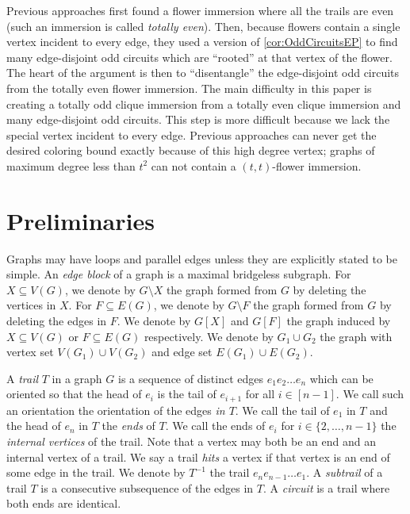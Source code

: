\documentclass{article}
\theoremstyle{definition}
\begin{document}
Previous approaches first found a flower immersion where all the trails are even (such an immersion is called \emph{totally even}). Then, because flowers contain a single vertex incident to every edge, they used a version of \cref{cor:OddCircuitsEP} to find many edge-disjoint odd circuits which are ``rooted'' at that vertex of the flower. The heart of the argument is then to ``disentangle'' the edge-disjoint odd circuits from the totally even flower immersion. The main difficulty in this paper is creating a totally odd clique immersion from a totally even clique immersion and many edge-disjoint odd circuits. This step is more difficult because we lack the special vertex incident to every edge. Previous approaches can never get the desired coloring bound exactly because of this high degree vertex; graphs of maximum degree less than $t^2$ can not contain a $(t,t)$-flower immersion.

\section{Preliminaries}\label{section:Preliminaries}

Graphs may have loops and parallel edges unless they are explicitly stated to be simple. An \emph{edge block} of a graph is a maximal bridgeless subgraph. For $X \subseteq V(G)$, we denote by $G \setminus X$ the graph formed from $G$ by deleting the vertices in $X$. For $F \subseteq E(G)$, we denote by $G \setminus F$ the graph formed from $G$ by deleting the edges in $F$. We denote by $G[X]$ and $G[F]$ the graph induced by $X \subseteq V(G)$ or $F \subseteq E(G)$ respectively. We denote by $G_1 \cup G_2$ the graph with vertex set $V(G_1) \cup V(G_2)$ and edge set $E(G_1) \cup E(G_2)$.

A \emph{trail} $T$ in a graph $G$ is a sequence of distinct edges $e_1e_2\dots e_n$ which can be oriented so that the head of $e_i$ is the tail of $e_{i+1}$ for all $i \in [n-1]$. We call such an orientation the orientation of the edges \emph{in $T$}. We call the tail of $e_1$ in $T$ and the head of $e_n$ in $T$ the \emph{ends} of $T$. We call the ends of $e_i$ for $i \in \{2, \dots, n-1\}$ the \emph{internal vertices} of the trail. Note that a vertex may both be an end and an internal vertex of a trail. We say a trail \emph{hits} a vertex if that vertex is an end of some edge in the trail. We denote by $T^{-1}$ the trail $e_ne_{n-1}\ldots e_1$. A \emph{subtrail} of a trail $T$ is a consecutive subsequence of the edges in $T$. A \emph{circuit} is a trail where both ends are identical.
\end{document}
